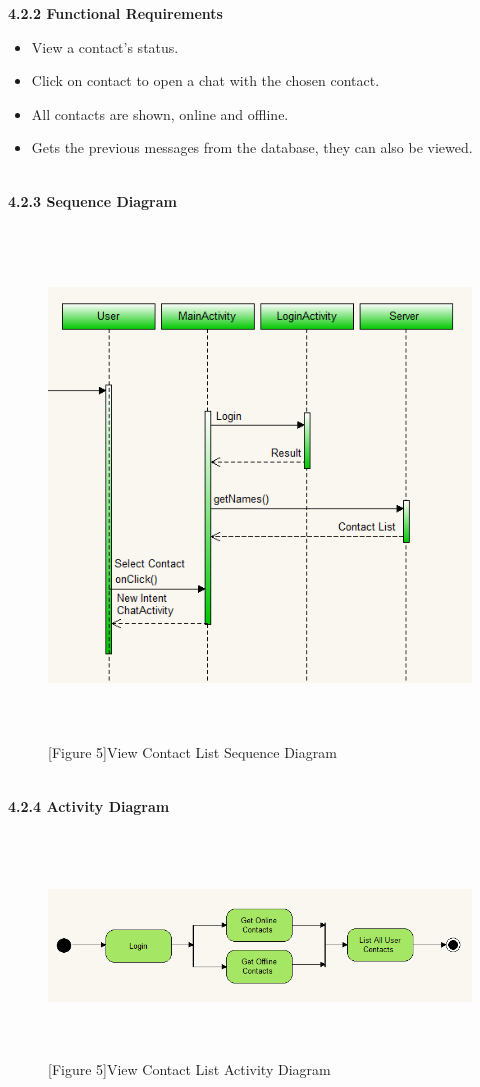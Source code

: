 \documentclass[29pt,a4paper]{moderncv}
\begin{document}
		\noindent\textbf{4.2.2 Functional Requirements}
			\begin{itemize}
				\item View a contact’s status.
				\item Click on contact to open a chat with the chosen contact.
				\item All contacts are shown, online and offline.
				\item Gets the previous messages from the database, they can also be viewed.\\
			\end{itemize}
\newpage
		\\ \left\textbf{4.2.3 Sequence Diagram} \\
			\begin{figure}
				\centering
				 \\ \includegraphics[width=5.5in, height=5.0in]{./viewContactsActivity.png}
				\\\caption{[Figure 5]View Contact List Sequence Diagram}
			\end{figure}	
			\newpage
			\\ \left\textbf{4.2.4 Activity Diagram} \\
						\begin{figure}
							\centering
							 \\ \includegraphics[width=5.5in, height=2.0in]{./acContactList.png}
							\\\caption{[Figure 5]View Contact List Activity Diagram}
						\end{figure}	
\end{document}
